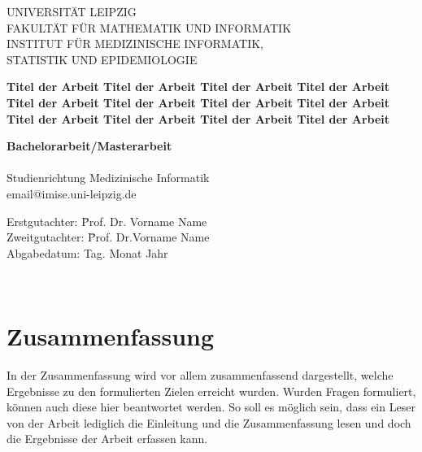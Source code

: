 \documentclass[headsepline,titlepage,twoside,12pt]{report}
\author{Vorname Name}
\begin{document}
\allowdisplaybreaks%

\onehalfspace

\begin{titlepage}
\thispagestyle{empty}
\begin{center}


{\large UNIVERSITÄT LEIPZIG\\[1mm]}
FAKULTÄT FÜR MATHEMATIK UND INFORMATIK\\
INSTITUT FÜR MEDIZINISCHE INFORMATIK,\\STATISTIK UND EPIDEMIOLOGIE\\

\vspace{2cm}

{\large\textbf{Titel der Arbeit Titel der Arbeit Titel der Arbeit Titel der Arbeit Titel der Arbeit Titel der Arbeit Titel der Arbeit Titel der Arbeit Titel der Arbeit Titel der Arbeit Titel der Arbeit Titel der Arbeit}}\\
\vspace*{4cm}


{\Huge\textbf{Bachelorarbeit/Masterarbeit}}\\
\vspace*{2cm}
{\Large\makeatletter\@author\makeatother\\
Studienrichtung Medizinische Informatik\\
email@imise.uni-leipzig.de
}\\

\vspace{2cm}

\parbox{1cm}{
\begin{large}
\begin{tabbing}
Erstgutachter: \hspace{.4cm} \=Prof. Dr. Vorname Name \\[2mm]
Zweitgutachter: \> \=Prof. Dr.Vorname Name\\[2mm]
Abgabedatum: \> Tag. Monat Jahr\\
\end{tabbing}
\end{large}}\\

\end{center}
\end{titlepage}

\tableofcontents

\chapter*{Zusammenfassung}
In der Zusammenfassung wird vor allem zusammenfassend dargestellt, welche Ergebnisse zu den formulierten Zielen erreicht wurden. Wurden Fragen formuliert, können auch diese hier beantwortet werden. So soll es möglich sein, dass ein Leser von der Arbeit lediglich die Einleitung und die Zusammenfassung lesen und doch die Ergebnisse der Arbeit erfassen kann.
\end{document}
